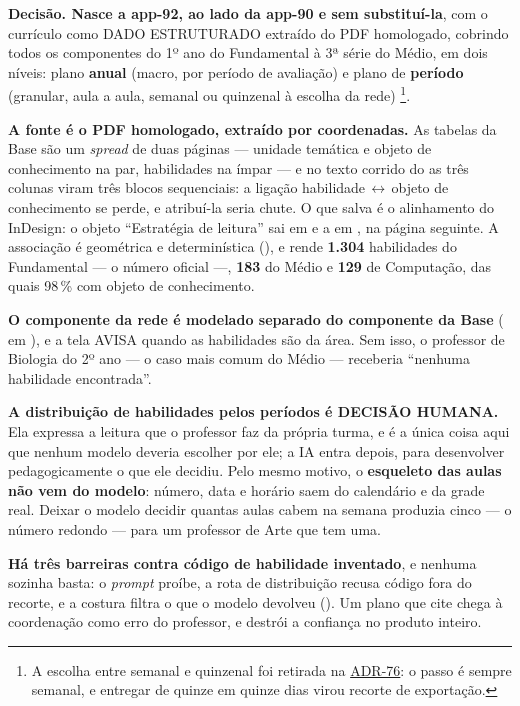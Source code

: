 \textbf{Decisão. Nasce a app-92, ao lado da app-90 e sem substituí-la}, com o
currículo como DADO ESTRUTURADO extraído do PDF homologado, cobrindo todos os
componentes do 1º ano do Fundamental à 3ª série do Médio, em dois níveis: plano
\textbf{anual} (macro, por período de avaliação) e plano de \textbf{período}
(granular, aula a aula, semanal ou quinzenal à escolha da rede)%
\footnote{A escolha entre semanal e quinzenal foi retirada na
\hyperref[adr:76]{ADR-76}: o passo é sempre semanal, e entregar de quinze em
quinze dias virou recorte de exportação.}.

\textbf{A fonte é o PDF homologado, extraído por coordenadas.} As tabelas da
Base são um \emph{spread} de duas páginas --- unidade temática e objeto de
conhecimento na par, habilidades na ímpar --- e no texto corrido do
 as três colunas viram três blocos sequenciais: a ligação
habilidade\,$\leftrightarrow$\,objeto de conhecimento se perde, e atribuí-la
seria chute. O que salva é o alinhamento do InDesign: o objeto
\enquote{Estratégia de leitura} sai em  e a  em
, na página seguinte. A associação é geométrica e determinística
(), e rende \textbf{1.304} habilidades do
Fundamental --- o número oficial ---, \textbf{183} do Médio e \textbf{129} de
Computação, das quais 98\,\% com objeto de conhecimento.

\textbf{O componente da rede é modelado separado do componente da Base}
( em ), e a tela AVISA quando as
habilidades são da área. Sem isso, o professor de Biologia do 2º ano --- o caso
mais comum do Médio --- receberia \enquote{nenhuma habilidade encontrada}.

\textbf{A distribuição de habilidades pelos períodos é DECISÃO HUMANA.} Ela
expressa a leitura que o professor faz da própria turma, e é a única coisa aqui
que nenhum modelo deveria escolher por ele; a IA entra depois, para desenvolver
pedagogicamente o que ele decidiu. Pelo mesmo motivo, o \textbf{esqueleto das
aulas não vem do modelo}: número, data e horário saem do calendário e da grade
real. Deixar o modelo decidir quantas aulas cabem na semana produzia cinco ---
o número redondo --- para um professor de Arte que tem uma.

\textbf{Há três barreiras contra código de habilidade inventado}, e nenhuma
sozinha basta: o \emph{prompt} proíbe, a rota de distribuição recusa código fora
do recorte, e a costura filtra o que o modelo devolveu
(). Um plano que cite  chega à
coordenação como erro do professor, e destrói a confiança no produto inteiro.

